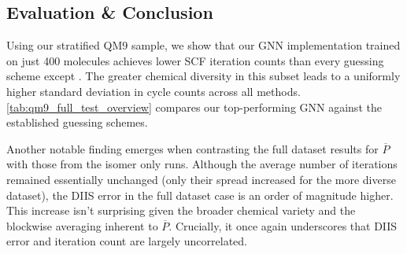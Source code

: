 \subsection{Evaluation \& Conclusion}
\label{sec:qm9_full_isomers_conclusion}
Using our stratified QM9 sample, we show that our GNN implementation trained on just 400 molecules achieves lower SCF iteration counts than every guessing scheme except . The greater chemical diversity in this subset leads to a uniformly higher standard deviation in cycle counts across all methods. \autoref{tab:qm9_full_test_overview} compares our top-performing GNN against the established guessing schemes.

Another notable finding emerges when contrasting the full dataset results for $\overline{P}$ with those from the isomer only runs. Although the average number of iterations remained essentially unchanged (only their spread increased for the more diverse dataset), the DIIS error in the full dataset case is an order of magnitude higher. This increase isn't surprising given the broader chemical variety and the blockwise averaging inherent to $\overline{P}$. Crucially, it once again underscores that DIIS error and iteration count are largely uncorrelated.
